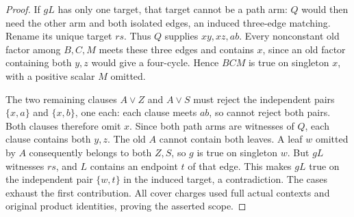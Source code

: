 \documentclass[11pt]{article}
\theoremstyle{definition}
\theoremstyle{remark}
\begin{document}
\begin{proof}
If $gL$ has only one target, that target cannot be a path arm: $Q$ would then need the other arm and both isolated edges, an induced three-edge matching. Rename its unique target $rs$. Thus $Q$ supplies $xy,xz,ab$. Every nonconstant old factor among $B,C,M$ meets these three edges and contains $x$, since an old factor containing both $y,z$ would give a four-cycle. Hence $BCM$ is true on singleton $x$, with a positive scalar $M$ omitted.

The two remaining clauses $A\vee Z$ and $A\vee S$ must reject the independent pairs $\{x,a\}$ and $\{x,b\}$, one each: each clause meets $ab$, so cannot reject both pairs. Both clauses therefore omit $x$. Since both path arms are witnesses of $Q$, each clause contains both $y,z$. The old $A$ cannot contain both leaves. A leaf $w$ omitted by $A$ consequently belongs to both $Z,S$, so $g$ is true on singleton $w$. But $gL$ witnesses $rs$, and $L$ contains an endpoint $t$ of that edge. This makes $gL$ true on the independent pair $\{w,t\}$ in the induced target, a contradiction. The cases exhaust the first contribution. All cover charges used full actual contexts and original product identities, proving the asserted scope.
\end{proof}
\end{document}
